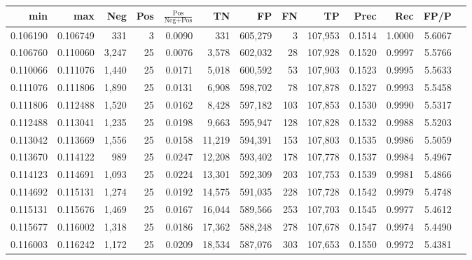 \begin{tabular}{rrrrrrrrrrrrr}
\toprule
     min &      max &   Neg & Pos & $\frac{\text{Pos}}{\text{Neg}+\text{Pos}}$ &      TN &      FP &      FN &      TP &   Prec &    Rec &   FP/P \\
\midrule
0.106190 & 0.106749 &   331 &   3 &                                     0.0090 &     331 & 605,279 &       3 & 107,953 & 0.1514 & 1.0000 & 5.6067 \\
0.106760 & 0.110060 & 3,247 &  25 &                                     0.0076 &   3,578 & 602,032 &      28 & 107,928 & 0.1520 & 0.9997 & 5.5766 \\
0.110066 & 0.111076 & 1,440 &  25 &                                     0.0171 &   5,018 & 600,592 &      53 & 107,903 & 0.1523 & 0.9995 & 5.5633 \\
0.111076 & 0.111806 & 1,890 &  25 &                                     0.0131 &   6,908 & 598,702 &      78 & 107,878 & 0.1527 & 0.9993 & 5.5458 \\
0.111806 & 0.112488 & 1,520 &  25 &                                     0.0162 &   8,428 & 597,182 &     103 & 107,853 & 0.1530 & 0.9990 & 5.5317 \\
0.112488 & 0.113041 & 1,235 &  25 &                                     0.0198 &   9,663 & 595,947 &     128 & 107,828 & 0.1532 & 0.9988 & 5.5203 \\
0.113042 & 0.113669 & 1,556 &  25 &                                     0.0158 &  11,219 & 594,391 &     153 & 107,803 & 0.1535 & 0.9986 & 5.5059 \\
0.113670 & 0.114122 &   989 &  25 &                                     0.0247 &  12,208 & 593,402 &     178 & 107,778 & 0.1537 & 0.9984 & 5.4967 \\
0.114123 & 0.114691 & 1,093 &  25 &                                     0.0224 &  13,301 & 592,309 &     203 & 107,753 & 0.1539 & 0.9981 & 5.4866 \\
0.114692 & 0.115131 & 1,274 &  25 &                                     0.0192 &  14,575 & 591,035 &     228 & 107,728 & 0.1542 & 0.9979 & 5.4748 \\
0.115131 & 0.115676 & 1,469 &  25 &                                     0.0167 &  16,044 & 589,566 &     253 & 107,703 & 0.1545 & 0.9977 & 5.4612 \\
0.115677 & 0.116002 & 1,318 &  25 &                                     0.0186 &  17,362 & 588,248 &     278 & 107,678 & 0.1547 & 0.9974 & 5.4490 \\
0.116003 & 0.116242 & 1,172 &  25 &                                     0.0209 &  18,534 & 587,076 &     303 & 107,653 & 0.1550 & 0.9972 & 5.4381 \\

\end{tabular}
